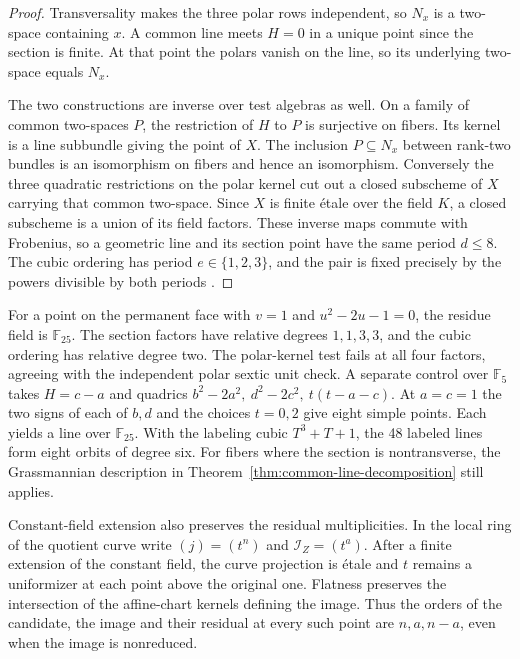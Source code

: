 \begin{proof}
Transversality makes the three polar rows independent, so \(N_x\) is
a two-space containing \(x\). A common line meets \(H=0\) in a unique
point since the section is finite. At that point the polars vanish
on the line, so its underlying two-space equals \(N_x\).

The two constructions are inverse over test algebras as well. On a
family of common two-spaces \(P\), the restriction of \(H\) to \(P\) is
surjective on fibers. Its kernel is a line subbundle giving the point
of \(X\). The inclusion \(P\subseteq N_x\) between rank-two bundles
is an isomorphism on fibers and hence an isomorphism. Conversely the
three quadratic restrictions on the polar kernel cut out a closed
subscheme of \(X\) carrying that common two-space. Since \(X\) is
finite étale over the field \(K\), a closed subscheme is a union of
its field factors. These inverse maps commute with Frobenius, so a
geometric line and its section point have the same period \(d\le8\).
The cubic ordering has period \(e\in\{1,2,3\}\), and the pair is
fixed precisely by the powers divisible by both periods
\cite{stacksEtalePoint}.
\end{proof}

For a point on the permanent face with \(v=1\) and
\(u^2-2u-1=0\), the residue field is \(\mathbb F_{25}\).
The section factors have relative degrees \(1,1,3,3\), and the
cubic ordering has relative degree two. The polar-kernel test fails at
all four factors, agreeing with the independent polar sextic unit check.
A separate control over \(\mathbb F_5\) takes \(H=c-a\) and quadrics
\(b^2-2a^2,\ d^2-2c^2,\ t(t-a-c)\). At \(a=c=1\) the two signs
of each of \(b,d\) and the choices \(t=0,2\) give eight simple
points. Each yields a line over \(\mathbb F_{25}\). With the labeling
cubic \(T^3+T+1\), the 48 labeled lines form eight orbits of degree six.
For fibers where the section is nontransverse, the Grassmannian
description in Theorem~\ref{thm:common-line-decomposition} still applies.

Constant-field extension also preserves the residual multiplicities.
In the local ring of the quotient curve write \((j)=(t^n)\) and
\(\mathcal I_Z=(t^a)\). After a finite extension of the constant field,
the curve projection is étale and \(t\) remains a uniformizer at each
point above the original one. Flatness preserves the intersection
of the affine-chart kernels defining the image. Thus the orders of
the candidate, the image and their residual at every such point are
\(n,a,n-a\), even when the image is nonreduced.

